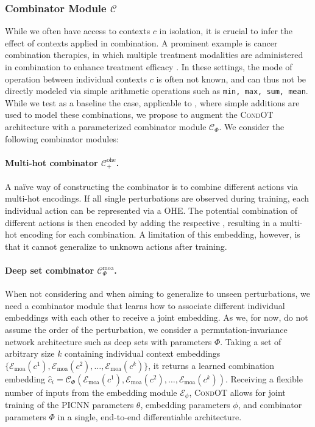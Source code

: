 \subsubsection{Combinator Module $\mathcal{C}$}
 While we often have access to contexts $c$ in isolation, it is crucial to infer the effect of contexts applied in combination. A prominent example is cancer combination therapies, in which multiple treatment modalities are administered in combination to enhance treatment efficacy \citep{kummar2010utilizing}.
In these settings, the mode of operation between individual contexts $c$ is often not known, and can thus not be directly modeled via simple arithmetic operations such as 
\texttt{min, max, sum, mean}.
While we test as a baseline the case, applicable to , where simple additions are used to model these combinations, we propose to augment the \textsc{CondOT} architecture with a parameterized combinator module $\mathcal{C}_\Phi$. We consider the following combinator modules:

\paragraph{Multi-hot combinator $\mathcal{C}^\text{ohe}_+$.}
A na\"ive way of constructing the combinator is to combine different actions via multi-hot encodings. If all single perturbations are observed during training, each individual action can be represented via a \acrlong{OHE}. The potential combination of different actions is then encoded by adding the respective , resulting in a multi-hot encoding for each combination.
A limitation of this embedding, however, is that it cannot generalize to unknown actions after training.

\paragraph{Deep set combinator $\mathcal{C}^\text{moa}_\Phi$.}
When not considering  and when aiming to generalize to unseen perturbations, we need a combinator module that learns how to associate different individual embeddings with each other to receive a joint embedding.
As we, for now, do not assume the order of the perturbation, we consider a permutation-invariance network architecture such as deep sets \citep{zaheer2017deep} with parameters $\Phi$. Taking a set of arbitrary size $k$ containing individual context embeddings $\{\mathcal{E}_\text{moa}(c^1), \mathcal{E}_\text{moa}(c^2), \dots, \mathcal{E}_\text{moa}(c^k)\}$, it returns a learned combination embedding $\hat{c}_i = \mathcal{C}_\Phi(\mathcal{E}_\text{moa}(c^1), \mathcal{E}_\text{moa}(c^2), \dots, \mathcal{E}_\text{moa}(c^k))$.
Receiving a flexible number of inputs from the embedding module $\mathcal{E}_\phi$, \textsc{CondOT} allows for joint training of the \acrshort{PICNN} parameters $\theta$, embedding parameters $\phi$, and combinator parameters $\Phi$ in a single, end-to-end differentiable architecture.


